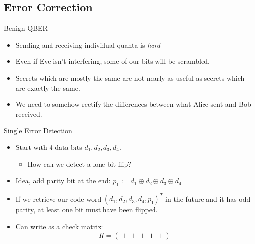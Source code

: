 \documentclass[pdf]{beamer}
\begin{document}
\subsection{Error Correction}
\begin{frame}{Benign QBER}
  \begin{itemize}
  \item Sending and receiving individual quanta is \emph{hard}
  \pause\item Even if Eve isn't interfering, some of our bits will be scrambled.
  \pause\item Secrets which are mostly the same are not nearly as useful as secrets which are
    exactly the same.
  \pause\item We need to somehow rectify the differences between what Alice sent and
    Bob received.
  \end{itemize}
\end{frame}
\begin{frame}{Single Error Detection}
  \begin{itemize}
  \item Start with 4 data bits $d_1,d_2,d_3,d_4$.
    \begin{itemize}
    \item How can we detect a lone bit flip?
    \end{itemize}
  \pause\item Idea, add parity bit at the end: $p_1 := d_1 \oplus d_2 \oplus d_3 \oplus d_4$
  \pause\item If we retrieve our code word $(d_1,d_2,d_3,d_4,p_1)^T$ in the future and
    it has odd parity, at least one bit must have been flipped.
  \pause\item Can write as a check matrix: \[ H = \begin{pmatrix}
        1 & 1 & 1 & 1 & 1
      \end{pmatrix} \]
  \end{itemize}
\end{frame}
\end{document}
